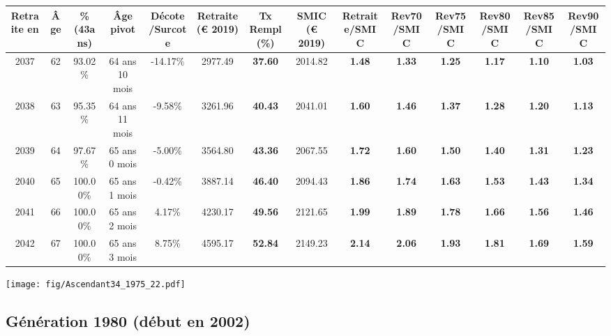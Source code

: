 \begin{adjustbox}{max width=\textwidth} 
\begin{tabular}[htb]{|c|c||c|c|c||c|c||c||c|c|c|c|c|c|} 
\hline 
 Retraite en &  Âge &  \%(43ans) &  Âge pivot &  Décote/Surcote &  Retraite (\euro{} 2019) &  Tx Rempl(\%) &  SMIC (\euro{} 2019) &  Retraite/SMIC &  Rev70/SMIC &  Rev75/SMIC &  Rev80/SMIC &  Rev85/SMIC &  Rev90/SMIC \\ 
\hline \hline 
 2037 &  62 &  93.02\% &  64 ans 10 mois &  -14.17\% &  2977.49 &  {\bf 37.60} &  2014.82 &  {\bf 1.48} &  {\bf 1.33} &  {\bf 1.25} &  {\bf 1.17} &  {\bf 1.10} &  {\bf 1.03} \\ 
\hline 
 2038 &  63 &  95.35\% &  64 ans 11 mois &  -9.58\% &  3261.96 &  {\bf 40.43} &  2041.01 &  {\bf 1.60} &  {\bf 1.46} &  {\bf 1.37} &  {\bf 1.28} &  {\bf 1.20} &  {\bf 1.13} \\ 
\hline 
 2039 &  64 &  97.67\% &  65 ans 0 mois &  -5.00\% &  3564.80 &  {\bf 43.36} &  2067.55 &  {\bf 1.72} &  {\bf 1.60} &  {\bf 1.50} &  {\bf 1.40} &  {\bf 1.31} &  {\bf 1.23} \\ 
\hline 
 2040 &  65 &  100.00\% &  65 ans 1 mois &  -0.42\% &  3887.14 &  {\bf 46.40} &  2094.43 &  {\bf 1.86} &  {\bf 1.74} &  {\bf 1.63} &  {\bf 1.53} &  {\bf 1.43} &  {\bf 1.34} \\ 
\hline 
 2041 &  66 &  100.00\% &  65 ans 2 mois &  4.17\% &  4230.17 &  {\bf 49.56} &  2121.65 &  {\bf 1.99} &  {\bf 1.89} &  {\bf 1.78} &  {\bf 1.66} &  {\bf 1.56} &  {\bf 1.46} \\ 
\hline 
 2042 &  67 &  100.00\% &  65 ans 3 mois &  8.75\% &  4595.17 &  {\bf 52.84} &  2149.23 &  {\bf 2.14} &  {\bf 2.06} &  {\bf 1.93} &  {\bf 1.81} &  {\bf 1.69} &  {\bf 1.59} \\ 
\hline 
\hline 
\end{tabular} 
\end{adjustbox} 
 
 \vspace{0.1cm} 

 \begin{center}\texttt{[image: fig/Ascendant34\_1975\_22.pdf]}\end{center} \label{fig/Ascendant34_1975_22.pdf} 

\newpage 
 
\subsection{Génération 1980 (début en 2002)} 

